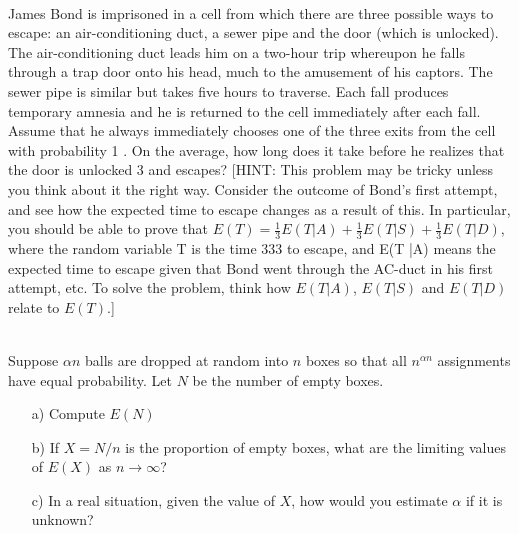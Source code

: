 \documentclass[]{article}
\newif\ifsolutions
\renewcommand{\answer}[1]{{\color{mydarkblue}\textbf{Solution:}#1}}
\begin{document}
\begin{qunlist}
 \\
James Bond is imprisoned in a cell from which there are three possible ways to escape: an air-conditioning
duct, a sewer pipe and the door (which is unlocked). The air-conditioning duct leads him on a two-hour trip
whereupon he falls through a trap door onto his head, much to the amusement of his captors. The sewer pipe
is similar but takes five hours to traverse. Each fall produces temporary amnesia and he is returned to the
cell immediately after each fall. Assume that he always immediately chooses one of the three exits from the
cell with probability 1 . On the average, how long does it take before he realizes that the door is unlocked 3
and escapes?
[HINT: This problem may be tricky unless you think about it the right way. Consider the outcome of Bond's
first attempt, and see how the expected time to escape changes as a result of this. In particular, you should
be able to prove that $E(T) = \frac{1}{3}E(T|A) + \frac{1}{3}E(T|S) + \frac{1}{3}E(T|D)$, where the random variable T is the time 333
to escape, and E(T |A) means the expected time to escape given that Bond went through the AC-duct in his first attempt, etc. To solve the problem, think how $E(T |A)$, $E(T |S)$ and $E(T |D)$ relate to $E(T )$.]

\ifsolutions{ \answer{
Using the notation in the extremely helpful hint, $E[T]=E[T\,|\, A]\Pr[A]+E[T\,|\, S]\Pr[S]+E[T\,|\, D]\Pr[D]=\frac{1}{3}(E[T\,|\, A]+E[T\,|\, S]+E[T\,|\, D])$.
Note that $E[T\,|\, A]=E[T]+2$ by the memorylessness of the situation.
Similarly, $E[T\,|\, S]=E[T]+5$. Lastly, $E[T\,|\, D]=0$ because
Mr. Bond escapes immediately. So we have that $E[T]=\frac{1}{3}(E[T]+2+E[T]+5+0)$.
Solving this for $E[T]$, we get that $E[T]=\fbox{\ensuremath{\mathbf{007}}}$.
}}
\fi

\\
Suppose $\alpha n$ balls are dropped at random into $n$ boxes so that all $n^{\alpha n}$ assignments have equal probability. Let $N$ be the number of empty boxes.
\begin{itemize}
\item[a)] Compute $E(N)$
\item[b)] If $X=N/n$ is the proportion of empty boxes, what are the limiting values of $E(X)$ as $n \rightarrow \infty$?
\item[c)] In a real situation, given the value of $X$, how would you estimate $\alpha$ if it is unknown?
\end{itemize}




\end{qunlist}
\end{document}

